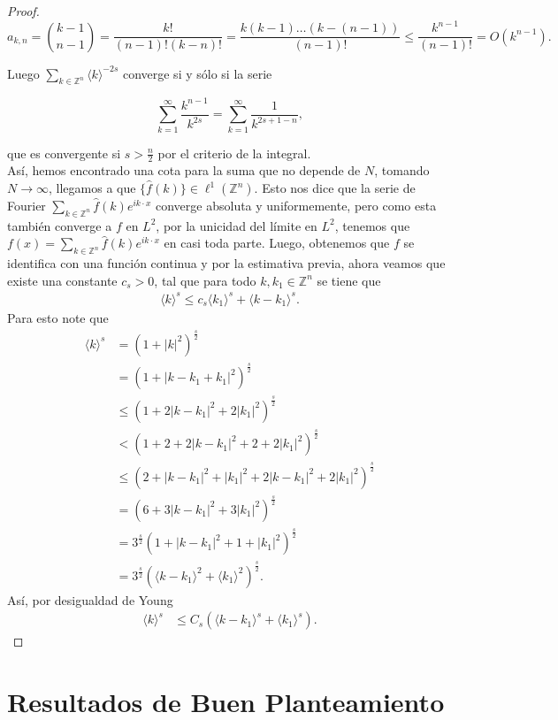\documentclass[12pt]{article}
\newcommand\Z{\ensuremath{\mathbb{Z}}}
\newcommand\jk{\langle k\rangle}
\begin{document}
\begin{proof}
$$a_{k,n}=\binom{k-1}{n-1}= \frac{k!}{(n-1)!(k-n)!}=\frac{k(k-1)\ldots(k-(n-1))}{(n-1)!}\leq \frac{k^{n-1}}{(n-1)!}=O(k^{n-1}).$$ 

Luego $\displaystyle\sum_{k \in \Z^n}\jk^{-2s}$ converge si y sólo si la serie

$$\sum_{k=1}^{\infty} \frac{k^{n-1}}{k^{2s}}=\sum_{k=1}^{\infty} \frac{1}{k^{2s+1-n}},$$

que es convergente si $s>\frac{n}{2}$ por el criterio de la integral.\\

Así, hemos encontrado una cota para la suma que no depende de $N$, tomando $N \rightarrow \infty$, llegamos a que $\{\widehat{f}(k)\} \in \ell^1(\mathbb{Z}^n)$. Esto nos dice que la serie de Fourier $\displaystyle\sum_{k\in \Z^n} \widehat{f}(k) e^{i k \cdot x}$ converge absoluta y uniformemente, pero como esta también converge a $f$ en $L^2$, por la unicidad del límite en $L^2$, tenemos que $f(x)=\displaystyle\sum_{k\in \Z^n} \widehat{f}(k) e^{i k \cdot x}$ en casi toda parte. Luego, obtenemos que $f$ se identifica con una función continua y por la estimativa previa, ahora veamos que existe una constante $c_s>0$, tal que para todo $k,k_1\in \Z^{n}$ se tiene que 
\begin{align*}
    \langle k \rangle ^{s}\leq c_s \langle k_1\rangle^{s} +\langle k-k_1 \rangle^{s}
.\end{align*}
Para esto note que 
\begin{align*}
    \langle k \rangle ^{s}&=(1+|k|^{2})^{\frac{s}{2}}\\
    &= (1+|k-k_1+k_1|^{2})^{\frac{s}{2}}\\
    &\leq (1+2|k-k_1|^{2}+2|k_1|^{2})^{\frac{s}{2}}\\
    & <(1+2+2|k-k_1|^{2}+2+2|k_1|^{2})^{\frac{s}{2}}\\
    &\leq (2+|k-k_1|^{2}+|k_1|^{2}+2|k-k_1|^{2}+2|k_1|^{2})^{\frac{s}{2}}\\ 
    &=(6+3|k-k_1|^{2}+3|k_1|^{2})^{\frac{s}{2}}\\
    &= 3^{\frac{s}{2}} (1+|k-k_1|^{2}+1+|k_1|^{2})^{\frac{s}{2}}\\
    &=3^{\frac{s}{2}} (\langle k-k_1\rangle^{2}+\langle k_1\rangle^{2})^{\frac{s}{2}}
.\end{align*}
Así, por desigualdad de Young
\begin{align*}
    \langle k \rangle ^{s}&\leq C_s (\langle k-k_1\rangle^{s}+\langle k_1\rangle^{s})
.\end{align*}


\end{proof}


\section{Resultados de Buen Planteamiento}

\newpage



\nocite{*}
\end{document}
